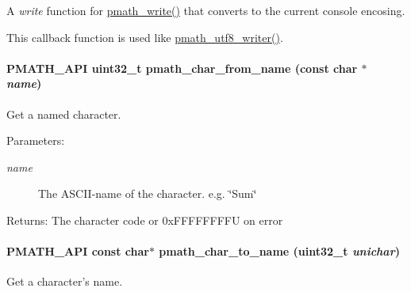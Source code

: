 A {\em write\/} function for \hyperlink{group__objects_g9f909b9eb04317260ee8630d10e5a7c6}{pmath\_\-write()} that converts to the current console encosing. 

This callback function is used like \hyperlink{group__strings_g5e7a9b1a5eb8861e94dc1bea92c77424}{pmath\_\-utf8\_\-writer()}. \hypertarget{group__strings_g963fd4f434edb806b3f2262726d849be}{
\paragraph[{pmath\_\-char\_\-from\_\-name}]{\setlength{\rightskip}{0pt plus 5cm}PMATH\_\-API uint32\_\-t pmath\_\-char\_\-from\_\-name (const char $\ast$ {\em name})}\hfill}
\label{group__strings_g963fd4f434edb806b3f2262726d849be}


Get a named character. 

\begin{Desc}
\item[Parameters:]
\begin{description}
\item[{\em name}]The ASCII-name of the character. e.g. \char`\"{}Sum\char`\"{} \end{description}
\end{Desc}
\begin{Desc}
\item[Returns:]The character code or 0xFFFFFFFFU on error \end{Desc}
\hypertarget{group__strings_g21de2fb0e4e344d00d728f1c2fc4a941}{
\paragraph[{pmath\_\-char\_\-to\_\-name}]{\setlength{\rightskip}{0pt plus 5cm}PMATH\_\-API const char$\ast$ pmath\_\-char\_\-to\_\-name (uint32\_\-t {\em unichar})}\hfill}
\label{group__strings_g21de2fb0e4e344d00d728f1c2fc4a941}


Get a character's name. 

